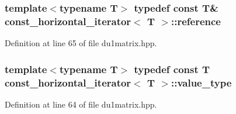 \hypertarget{classconst__horizontal__iterator_aa685786b86159c42546250d5026fa205}{
\subsubsection[{reference}]{\setlength{\rightskip}{0pt plus 5cm}template$<$typename T$>$ typedef const T\& {\bf const\-\_\-horizontal\-\_\-iterator}$<$ T $>$\-::{\bf reference}}}\label{classconst__horizontal__iterator_aa685786b86159c42546250d5026fa205}


Definition at line 65 of file du1matrix.\-hpp.

\hypertarget{classconst__horizontal__iterator_a426fd02977338edd9904f1bdfb7f9d6a}{
\subsubsection[{value\-\_\-type}]{\setlength{\rightskip}{0pt plus 5cm}template$<$typename T$>$ typedef const T {\bf const\-\_\-horizontal\-\_\-iterator}$<$ T $>$\-::{\bf value\-\_\-type}}}\label{classconst__horizontal__iterator_a426fd02977338edd9904f1bdfb7f9d6a}


Definition at line 64 of file du1matrix.\-hpp.



